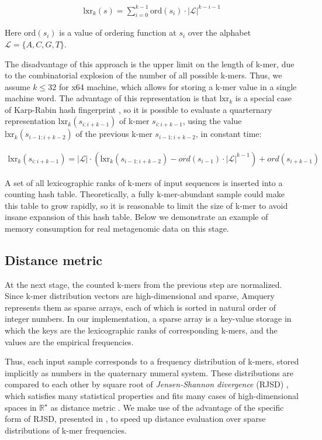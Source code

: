 \documentclass[10pt,letterpaper]{article}
\begin{document}
\begin{eqnarray}
\label{eq:schemeP}
    \mathrm{lxr}_k(s) = \sum_{i=0}^{k−1} \mathrm{ord}(s_i) \cdot |{\mathcal{L}}|^{k−i−1}
\end{eqnarray}

Here $\mathrm{ord}(s_i)$ is a value of ordering function at $s_i$ over the alphabet ${\mathcal{L}} = \{A, C, G, T \}$. 

The disadvantage of this approach is the upper limit on the length of k-mer, due to the combinatorial explosion of the number of all possible k-mers. Thus, we assume $k \leq 32$ for x64 machine, which allows for storing a k-mer value in a single machine word.
The advantage of this representation is that $\mathrm{lxr}_k$ is a special case of Karp-Rabin hash fingerprint \cite{karp1987efficient}, so it is possible to evaluate a quarternary representation $\mathrm{lxr}_k(s_{i:i+k-1})$ of k-mer $s_{i:i+k-1}$, using the value $\mathrm{lxr}_k(s_{i−1:i+k-2})$ of the previous k-mer $s_{i−1:i+k-2}$, in constant time:

\begin{eqnarray}
\label{eq:schemeP}
    \mathrm{lxr}_k(s_{i:i+k-1}) = |{\mathcal{L}}| \cdot (\mathrm{lxr}_k(s_{i−1:i+k-2}) − ord(s_{i−1}) \cdot 
									 |{\mathcal{L}}|^{k−1}) + ord(s_{i+k−1})
\end{eqnarray}

A set of all lexicographic ranks of k-mers of input sequences is inserted into a counting hash table. Theoretically, a fully k-mer-abundant sample could make this table to grow rapidly, so it is reasonable to limit the size of k-mer to avoid insane expansion of this hash table. Below we demonstrate an example of memory consumption for real metagenomic data on this stage.

\subsection*{Distance metric}
At the next stage, the counted k-mers from the previous step are normalized. Since k-mer distribution vectors are high-dimensional and sparse, Amquery represents them as sparse arrays, each of which is sorted in natural order of integer numbers. 
In our implementation, a sparse array is a key-value storage in which the keys are the lexicographic ranks of corresponding k-mers, and the values are the empirical frequencies.

Thus, each input sample corresponds to a frequency distribution of k-mers, stored implicitly as numbers in the quaternary numeral system. These distributions are compared to each other by square root of \textit{Jensen-Shannon divergence} (RJSD) \cite{lin1991divergence}, which satisfies many statistical properties and fits many cases of high-dimensional spaces in $\mathbb{R^\star}$ as distance metric \cite{fuglede2004jensen, endres2003new}. We make use of the advantage of the specific form of RJSD, presented in \cite{connor2013evaluation}, to speed up distance evaluation over sparse distributions of k-mer frequencies.
\end{document}
